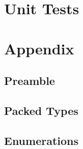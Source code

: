 

\section{Unit Tests}



\section{Appendix}

\subsection{Preamble}



\subsection{Packed Types}



\subsection{Enumerations}




